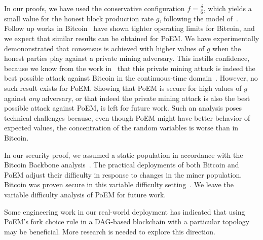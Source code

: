 \noindent
{}
In our proofs, we have used the conservative configuration $f = \frac{\delta}{6}$,
which yields a small value for the honest block production rate $g$, following the model
of~\cite{backbone}. Follow up works in Bitcoin~\cite{tight-bounds} have shown tighter
operating limits for Bitcoin, and we expect that similar results can be obtained for PoEM.
We have experimentally demononstrated that consensus is achieved with higher values
of $g$ when the honest parties play against a private mining adversary. This instills
confidence, because we know from the work in~\cite{eiar} that this private mining attack
is indeed the best possible attack against Bitcoin in the continuous-time domain~\cite{bitcoin-made-simple}.
However, no such result exists for
PoEM. Showing that PoEM is secure for high values of $g$ against \emph{any} adversary,
or that indeed the private mining attack is also the best possible attack against PoEM,
is left for future work. Such an analysis poses technical challenges because, even though
PoEM might have better behavior of expected values, the concentration of the random
variables is worse than in Bitcoin.

\noindent
{}
In our security proof, we assumed a static population in accordance with
the Bitcoin Backbone analysis~\cite{backbone}. The practical deployments of
both Bitcoin and PoEM adjust their difficulty in response to changes in the
miner population. Bitcoin was proven secure in this variable difficulty
setting~\cite{varbackbone}. We leave the variable difficulty analysis of PoEM
for future work.

\noindent
\myparagraph[DAGs]
Some engineering work in our real-world deployment has indicated that using
PoEM's fork choice rule in a DAG-based blockchain with a particular topology
may be beneficial. More research is needed to explore this direction.
